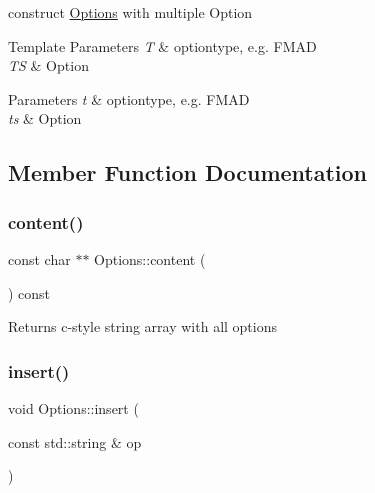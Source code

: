 construct \hyperlink{classyacx_1_1_options}{Options} with multiple Option 
\begin{DoxyTemplParams}{Template Parameters}
{\em T} & optiontype, e.\+g. F\+M\+AD \\
\hline
{\em TS} & Option \\
\hline
\end{DoxyTemplParams}

\begin{DoxyParams}{Parameters}
{\em t} & optiontype, e.\+g. F\+M\+AD \\
\hline
{\em ts} & Option \\
\hline
\end{DoxyParams}


\subsection{Member Function Documentation}
\mbox{\label{classyacx_1_1_options_addb823fd1b5f5af2b7c4073bac8ec70b}} 
\subsubsection{\texorpdfstring{content()}{content()}}
{\footnotesize\ttfamily const char $\ast$$\ast$ Options\+::content (\begin{DoxyParamCaption}{ }\end{DoxyParamCaption}) const}

\begin{DoxyReturn}{Returns}
c-\/style string array with all options 
\end{DoxyReturn}
\mbox{\label{classyacx_1_1_options_a717bfff574dc2134fae4a0b3ffc9d656}} 
\subsubsection{\texorpdfstring{insert()}{insert()}\hspace{0.1cm}{\footnotesize\ttfamily [1/2]}}
{\footnotesize\ttfamily void Options\+::insert (\begin{DoxyParamCaption}\item[{const std\+::string \&}]{op }\end{DoxyParamCaption})}

